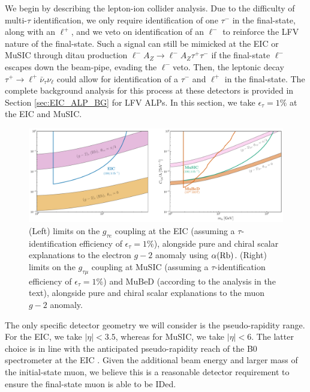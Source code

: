 We begin by describing the lepton-ion collider analysis. Due to the difficulty of multi-$\tau$ identification, we only require identification of one $\tau^-$ in the final-state, along with an $\ell^+$, and we veto on identification of an $\ell^-$ to reinforce the LFV nature of the final-state.  Such a signal can still be mimicked at the EIC or MuSIC through ditau production $\ell^- A_Z \rightarrow \ell^- A_Z \tau^+\tau^-$ if the final-state $\ell^-$ escapes down the beam-pipe, evading the $\ell^-$veto. Then, the leptonic decay $\tau^+\rightarrow \ell^+\bar{\nu}_\tau {\nu}_\ell$ could allow for identification of a $\tau^-$ and $\ell^+$ in the final-state. The complete background analysis for this process at these detectors is provided in  Section \ref{sec:EIC_ALP_BG} for LFV ALPs. In this section, we take $\epsilon_\tau = 1\%$ at the EIC and MuSIC.
\begin{figure}[t!]
    \centering
    \includegraphics[width=\linewidth]{figures/chapter4/lfv_scalar_limits_and_g_2.pdf}
    \caption[Limits on LFV scalars at various lepton-nucleus collision experiments.]{(Left) limits on the $g_{\tau e}$ coupling at the EIC (assuming a $\tau$-identification efficiency of $\epsilon_\tau = 1\%$), alongside pure and chiral scalar explanations to the electron $g-2$ anomaly using $\alpha({\rm Rb})$. (Right) limits on the $g_{\tau \mu}$ coupling at MuSIC (assuming a $\tau$-identification efficiency of $\epsilon_\tau = 1\%$) and MuBeD (according to the analysis in the text), alongside pure and chiral scalar explanations to the muon $g-2$ anomaly.}
    \label{fig:scalar_limits}
\end{figure}
The only specific detector geometry we will consider is the pseudo-rapidity range. For the EIC, we take $|\eta| < 3.5$, whereas for MuSIC, we take $|\eta| < 6$. The latter choice is in line with the anticipated pseudo-rapidity reach of the B0 spectrometer at the EIC \cite{Adkins:2022jfp}. Given the additional beam energy and larger mass of the initial-state muon, we believe this is a reasonable detector requirement to ensure the final-state muon is able to be IDed.

